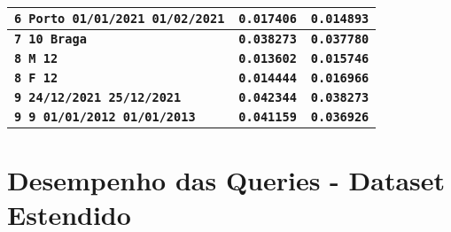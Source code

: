 \documentclass[12pt,a4paper]{report}
\begin{document}
{\begin{tabularx}{\textwidth} { 
  | >{\centering\arraybackslash}X
  | >{\centering\arraybackslash}X
  | >{\centering\arraybackslash}X | }
 \hline
 \texttt{\textbf{6 Porto 01/01/2021 01/02/2021}} & \vspace{-5pt}\texttt{\textbf{0.017406}} & \vspace{-5pt}\texttt{\textbf{0.014893}} \\
 \hline
 \texttt{\textbf{7 10 Braga}} & \texttt{\textbf{0.038273}} & \texttt{\textbf{0.037780}} \\
 \hline
 \texttt{\textbf{8 M 12}} & \texttt{\textbf{0.013602}} & \texttt{\textbf{0.015746}} \\
 \hline
 \texttt{\textbf{8 F 12}} & \texttt{\textbf{0.014444}} & \texttt{\textbf{0.016966}} \\
 \hline
 \texttt{\textbf{9 24/12/2021 25/12/2021}} & \vspace{-5pt}\texttt{\textbf{0.042344}} & \vspace{-5pt}\texttt{\textbf{0.038273}} \\
 \hline
 \texttt{\textbf{9 9 01/01/2012 01/01/2013}} & \vspace{-5pt}\texttt{\textbf{0.041159}} & \vspace{-5pt}\texttt{\textbf{0.036926}} \\
 \hline
 \end{tabularx}
}


\newpage

\section{Desempenho das Queries - Dataset Estendido}
\end{document}
